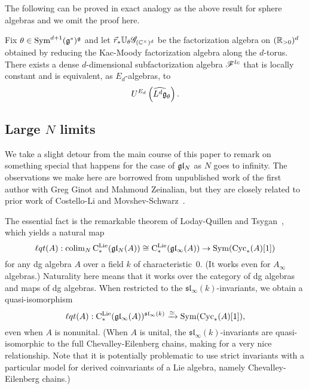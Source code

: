 The following can be proved in exact analogy as the above result for sphere algebras and we omit the proof here.

\begin{prop}
Fix $\theta \in {\rm Sym}^{d+1}(\mathfrak g^*)^\mathfrak g$ and let $\vec{r}_* \mathbb U_\theta \mathscr G_{(\mathbb C^\times)^d}$ be the factorization algebra on $(\mathbb R_{>0})^d$ obtained by reducing the Kac-Moody factorization algebra along the $d$-torus.
There exists a dense $d$-dimensional subfactorization algebra $\mathscr F^{lc}$ that is locally constant and is equivalent, as $E_d$-algebras, to
\[
U^{E_d} \left( \widehat{L^d \mathfrak g}_{\theta} \right) .
\]
\end{prop}



\subsection{Large $N$ limits}

\def\cycls{{\rm Cyc}_*}
\def\lqt{{\ell q t}}
\def\colim{{\rm colim}}
\def\sl{\mathfrak{sl}}

We take a slight detour from the main course of this paper to remark on something special that happens for the case of $\mathfrak{g} \mathfrak{l}_N$ as $N$ goes to infinity.
The observations we make here are borrowed from unpublished work of the first author with Greg Ginot and Mahmoud Zeinalian,
but they are closely related to prior work of Costello-Li \cite{} and Movshev-Schwarz~\cite{}.

The essential fact is the remarkable theorem of Loday-Quillen \cite{LQ} and Tsygan~\cite{Tsy},
which yields a natural map 
\[
\lqt(A) :\colim_{N}\, \cliels(\gl_N(A)) \cong \cliels(\gl_\infty(A)) \to \Sym(\cycls(A)[1])
\]
for any dg algebra $A$ over a field $k$ of characteristic~0.
(It works even for $A_\infty$ algebras.)
Naturality here means that it works over the category of dg algebras and maps of dg algebras.
When restricted to the $\sl_\infty(k)$-invariants, we obtain a quasi-isomorphism
\[
\lqt(A) :\cliels(\gl_\infty(A))^{\sl_\infty(k)} \xto{\simeq} \Sym(\cycls(A)[1]),
\]
even when $A$ is nonunital. 
(When $A$ is unital, the $\sl_\infty(k)$-invariants are quasi-isomorphic to the full Chevalley-Eilenberg chains,
making for a very nice relationship. 
Note that it is potentially problematic to use strict invariants with a particular model for derived coinvariants of a Lie algebra,
namely Chevalley-Eilenberg chains.)

